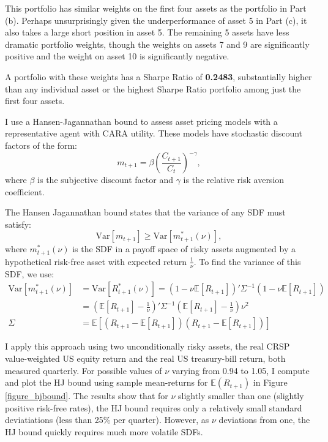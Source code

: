 \documentclass[12pt]{article}
\newcommand{\E}{\mathbb{E}}
\begin{document}
\doublespacing
This portfolio has similar weights on the first four assets as the portfolio in Part (b). Perhaps unsurprisingly given the underperformance of asset 5 in Part (c), it also takes a large short position in asset 5. The remaining 5 assets have less dramatic portfolio weights, though the weights on assets 7 and 9 are significantly positive and the weight on asset 10 is significantly negative.

A portfolio with these weights has a Sharpe Ratio of \textbf{0.2483}, substantially higher than any individual asset or the highest Sharpe Ratio portfolio among just the first four assets.

\clearpage


I use a Hansen-Jagannathan bound to assess asset pricing models with a representative agent with CARA utility. These models have stochastic discount factors of the form:
$$m_{t+1} = \beta \left( \frac{C_{t+1}}{C_t} \right)^{-\gamma},$$
where $\beta$ is the subjective discount factor and $\gamma$ is the relative risk aversion coefficient.

The Hansen Jagannathan bound states that the variance of any SDF must satisfy:
$$\text{Var}[m_{t+1}] \geq \text{Var}[m^*_{t+1}(\nu)],$$
where $m^*_{t+1}(\nu)$ is the SDF in a payoff space of risky assets augmented by a hypothetical risk-free asset with expected return $\frac{1}{\nu}$. To find the variance of this SDF, we use:
\begin{align*}
\text{Var}[m^*_{t+1}(\nu)] &= \text{Var}[R^*_{t+1}(\nu)] = (1 - \nu \E[R_{t+1}])'\Sigma^{-1}(1 - \nu \E[R_{t+1}])\\
&= \left( \E[R_{t+1}] - \frac{1}{\nu} \right)' \Sigma^{-1} \left( \E[R_{t+1}] - \frac{1}{\nu} \right) \nu^2 \\
\Sigma &= \E[(R_{t+1}-\E[R_{t+1}])(R_{t+1}-\E[R_{t+1}])]
\end{align*}

I apply this approach using two unconditionally risky assets, the real CRSP value-weighted US equity return and the real US treasury-bill return, both measured quarterly. For possible values of $\nu$ varying from 0.94 to 1.05, I compute and plot the HJ bound using sample mean-returns for $\E(R_{t+1})$ in Figure \ref{figure_hjbound}. The results show that for $\nu$ slightly smaller than one (slightly positive risk-free rates), the HJ bound requires only a relatively small standard deviatiations (less than 25\% per quarter). However, as $\nu$ deviations from one, the HJ bound quickly requires much more volatile SDFs.
\end{document}
